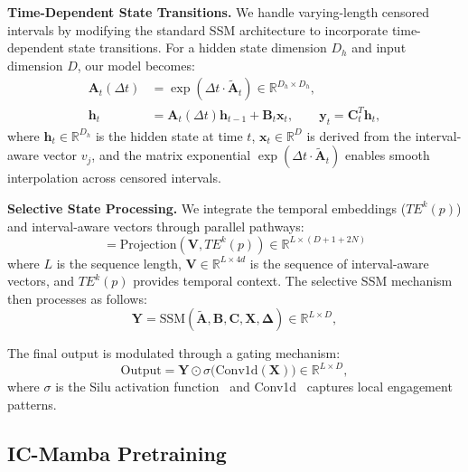 \noindent\textbf{Time-Dependent State Transitions.}
We handle varying-length censored intervals by modifying the standard SSM architecture to incorporate time-dependent state transitions. 
For a hidden state dimension $D_h$ and input dimension $D$, our model becomes:
\begin{align*}
    \mathbf{A}_t(\Delta t) &= \exp(\Delta t \cdot \tilde{\mathbf{A}}_t) \in \mathbb{R}^{D_h \times D_h}, \\ 
    \mathbf{h}_t &= \mathbf{A}_t(\Delta t) \mathbf{h}_{t-1} + \mathbf{B}_t \mathbf{x}_t, \quad\quad \mathbf{y}_t = \mathbf{C}_t^T \mathbf{h}_t,
\end{align*}
where $\mathbf{h}_t \in \mathbb{R}^{D_h}$ is the hidden state at time $t$, $\mathbf{x}_t \in \mathbb{R}^D$ is derived from the interval-aware vector $v_j$, and the matrix exponential $\exp(\Delta t \cdot \tilde{\mathbf{A}}_t)$ enables smooth interpolation across censored intervals.

\noindent\textbf{Selective State Processing.}
We integrate the temporal embeddings (${TE}^k(p)$) and interval-aware vectors through parallel pathways:
\begin{equation*}
        [\mathbf{X}, \boldsymbol{\Delta}, \mathbf{B}, \mathbf{C}] = \text{Projection}\left(\mathbf{V}, {TE}^k(p)\right) \in \mathbb{R}^{L \times (D + 1 + 2N)}
\end{equation*}
where $L$ is the sequence length, $\mathbf{V} \in \mathbb{R}^{L \times 4d}$ is the sequence of interval-aware vectors, and ${TE}^k(p)$ provides temporal context. 
The selective SSM mechanism then processes as follows:
\begin{equation*}
\mathbf{Y} = \text{SSM}(\tilde{\mathbf{A}}, \mathbf{B}, \mathbf{C}, \mathbf{X}, \boldsymbol{\Delta}) \in \mathbb{R}^{L \times D},
\end{equation*}

The final output is modulated through a gating mechanism:
\begin{equation*}
\text{Output} = \mathbf{Y} \odot \sigma \bigl(\text{Conv1d}(\mathbf{X})\bigl) \in \mathbb{R}^{L \times D},
\end{equation*}
where $\sigma$ is the Silu activation function~\citep{elfwing2018sigmoid} and Conv1d~\citep{gu2021combining} captures local engagement patterns.



\subsection{IC-Mamba Pretraining}
\label{subsec:ic-mamba-pretrain}

